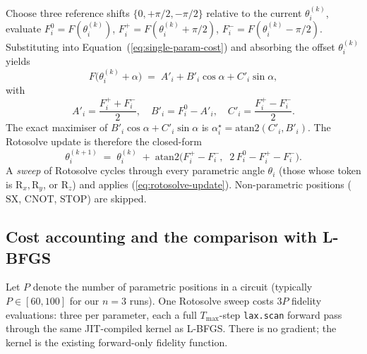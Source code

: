 \documentclass[11pt,a4paper]{article}
\begin{document}
Choose three reference shifts $\{0, +\pi/2, -\pi/2\}$ relative to the
current $\theta_i^{(k)}$, evaluate
$F^0_i = F(\theta_i^{(k)})$,
$F^+_i = F(\theta_i^{(k)} + \pi/2)$,
$F^-_i = F(\theta_i^{(k)} - \pi/2)$. Substituting into
Equation~(\ref{eq:single-param-cost}) and absorbing the offset $\theta_i^{(k)}$
yields
\begin{equation}
F\bigl(\theta_i^{(k)} + \alpha\bigr)
\;=\;
A'_i + B'_i\cos\alpha + C'_i\sin\alpha,
\end{equation}
with
\begin{equation}
A'_i = \frac{F^+_i + F^-_i}{2},\quad
B'_i = F^0_i - A'_i,\quad
C'_i = \frac{F^+_i - F^-_i}{2}.
\end{equation}
The exact maximiser of $B'_i\cos\alpha + C'_i\sin\alpha$ is
$\alpha^\star_i = \mathrm{atan2}(C'_i, B'_i)$. The Rotosolve update is
therefore the closed-form
\begin{equation}
\boxed{\;
\theta_i^{(k+1)}
\;=\;
\theta_i^{(k)}
\;+\;
\mathrm{atan2}\!\bigl(F^+_i - F^-_i,\;\;2\,F^0_i - F^+_i - F^-_i\bigr).
\;}
\label{eq:rotosolve-update}
\end{equation}
A \emph{sweep} of Rotosolve cycles through every parametric angle
$\theta_i$ (those whose token is $\mathrm{R}_x, \mathrm{R}_y$, or
$\mathrm{R}_z$) and applies (\ref{eq:rotosolve-update}). Non-parametric
positions ($\mathrm{SX}$, $\mathrm{CNOT}$, $\mathrm{STOP}$) are skipped.

\subsection{Cost accounting and the comparison with L-BFGS}

Let $P$ denote the number of parametric positions in a circuit (typically
$P \in [60, 100]$ for our $n = 3$ runs). One Rotosolve sweep costs $3P$
fidelity evaluations: three per parameter, each a full $T_{\max}$-step
\texttt{lax.scan} forward pass through the same JIT-compiled kernel as
L-BFGS. There is no gradient; the kernel is the existing forward-only
fidelity function.
\end{document}
